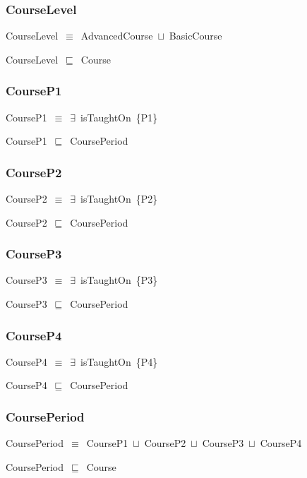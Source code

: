 \documentclass{article}
\begin{document}
\subsubsection*{CourseLevel}

CourseLevel~\ensuremath{\equiv}~AdvancedCourse~\ensuremath{\sqcup}~BasicCourse

CourseLevel~\ensuremath{\sqsubseteq}~Course~

\subsubsection*{CourseP1}

CourseP1~\ensuremath{\equiv}~\ensuremath{\exists}~isTaughtOn~\{P1\}

CourseP1~\ensuremath{\sqsubseteq}~CoursePeriod~

\subsubsection*{CourseP2}

CourseP2~\ensuremath{\equiv}~\ensuremath{\exists}~isTaughtOn~\{P2\}

CourseP2~\ensuremath{\sqsubseteq}~CoursePeriod~

\subsubsection*{CourseP3}

CourseP3~\ensuremath{\equiv}~\ensuremath{\exists}~isTaughtOn~\{P3\}

CourseP3~\ensuremath{\sqsubseteq}~CoursePeriod~

\subsubsection*{CourseP4}

CourseP4~\ensuremath{\equiv}~\ensuremath{\exists}~isTaughtOn~\{P4\}

CourseP4~\ensuremath{\sqsubseteq}~CoursePeriod~

\subsubsection*{CoursePeriod}

CoursePeriod~\ensuremath{\equiv}~CourseP1~\ensuremath{\sqcup}~CourseP2~\ensuremath{\sqcup}~CourseP3~\ensuremath{\sqcup}~CourseP4

CoursePeriod~\ensuremath{\sqsubseteq}~Course~
\end{document}
